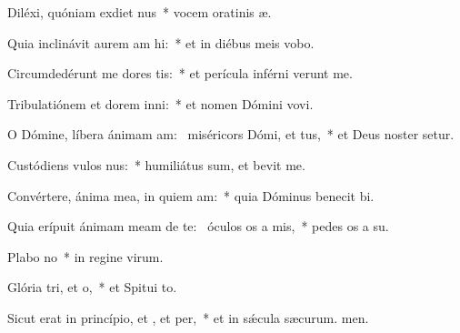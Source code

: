 \item Diléxi, quóniam exdiet nus~* vocem oratinis æ.
\item Quia inclinávit aurem am hi:~* et in diébus meis vobo.
\item Circumdedérunt me dores tis:~* et perícula inférni verunt me.
\item Tribulatiónem et dorem inni:~* et nomen Dómini vovi.
\item O Dómine, líbera ánimam am:~\pscross{} miséricors Dómi, et tus,~* et Deus noster setur.
\item Custódiens vulos nus:~* humiliátus sum, et bevit me.
\item Convértere, ánima mea, in quiem am:~* quia Dóminus benecit bi.
\item Quia erípuit ánimam meam de te:~\pscross{} óculos os a mis,~* pedes os a su.
\item Plabo no~* in regine virum.
\item Glória tri, et o,~* et Spitui to.
\item Sicut erat in princípio, et , et per,~* et in sǽcula sæcurum. men.
